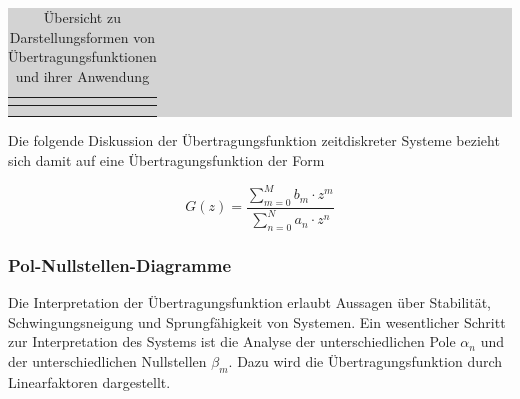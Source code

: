 \begin{table}[H]
\setlength{\arrayrulewidth}{.1em}
\caption{\"{U}bersicht zu Darstellungsformen von \"{U}bertragungsfunktionen und ihrer Anwendung}
\setlength{\fboxsep}{0pt}%
\colorbox{lightgray}{%
%
\begin{tabular}{| c | c | c |}
\hline
\parbox[c][0.3in][c]{1.9in}{\smallskip\centering\textbf{\selectfont{Anwendung}}} & 
\parbox[c][0.3in][c]{2.2in}{\smallskip\centering\textbf{\selectfont{Zeitkontinuierliche Systeme}}} &
\parbox[c][0.3in][c]{2.2in}{\smallskip\centering\textbf{\selectfont{Zeitdiskrete Systeme}}}\\ \hline


\parbox[c][1in][c]{1.9in}{} & 
\parbox[c][1in][c]{2.2in}{} &
\parbox[c][1in][c]{2.2in}{}\\
\hline

\parbox[c][1in][c]{1.9in}{} & 
\parbox[c][1in][c]{2.2in}{} &
\parbox[c][1in][c]{2.2in}{}\\
\hline


\end{tabular}%
}
\label{tab:sixfive}
\end{table}

\noindent Die folgende Diskussion der \"{U}bertragungsfunktion zeitdiskreter Systeme bezieht sich damit auf eine \"{U}bertragungsfunktion der Form

\begin{equation}\label{eq:sixseventyfour}
G\left(z\right)=\frac{\sum _{m=0}^{M}b_{m}\cdot z^{m}}{\sum _{n=0}^{N}a_{n} \cdot z^{n}}
\end{equation}

\subsubsection{Pol-Nullstellen-Diagramme}

\noindent Die Interpretation der \"{U}bertragungsfunktion erlaubt Aussagen \"{u}ber Stabilit\"{a}t, Schwingungsneigung und Sprungf\"{a}higkeit von Systemen. Ein wesentlicher Schritt zur Interpretation des Systems ist die Analyse der unterschiedlichen Pole $\alpha_{n}$ und der unterschiedlichen Nullstellen $\beta_{m}$. Dazu wird die \"{U}bertragungsfunktion durch Linearfaktoren dargestellt. 

